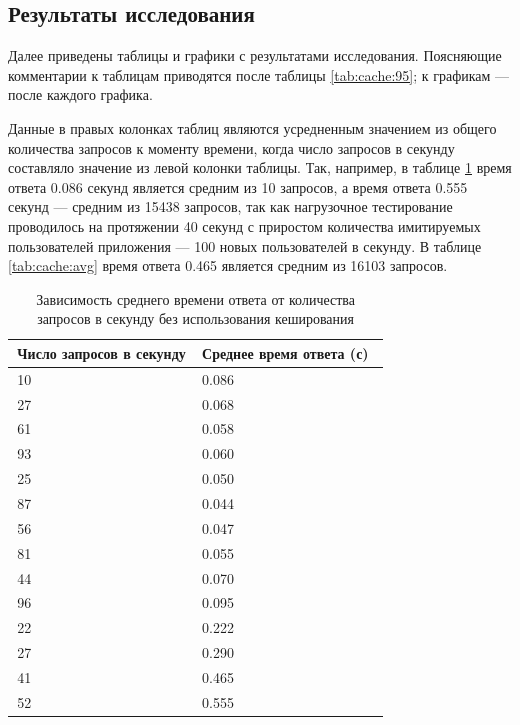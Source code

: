 \subsection{Результаты исследования}

Далее приведены таблицы и графики с результатами исследования.
Поясняющие комментарии к таблицам приводятся после таблицы \ref{tab:cache:95}; к графикам --- после каждого графика.

Данные в правых колонках таблиц являются усредненным значением из общего количества запросов к моменту времени, когда число запросов в секунду составляло значение из левой колонки таблицы.
Так, например, в таблице \ref{tab:nocache:avg} время ответа 0.086 секунд является средним из 10 запросов, а время ответа 0.555 секунд --- средним из 15438 запросов, так как нагрузочное тестирование проводилось на протяжении 40 секунд с приростом количества имитируемых пользователей приложения --- 100 новых пользователей в секунду.
В таблице \ref{tab:cache:avg} время ответа 0.465 является средним из  16103 запросов.

\begin{table}[H]
\centering
\caption{Зависимость среднего времени ответа от количества запросов в секунду без использования кеширования}
\begin{tabular}{|m{6.85cm}|m{9.25cm}|}
\hline
    \,\hfill \textbf{Число запросов в секунду} & \,\hfill \textbf{Среднее время ответа (с)} \hfill\, \\ \hline
    \,\hfill 10 \hfill\, & \,\hfill 0.086 \hfill\, \\ \hline
    \,\hfill 27 \hfill\, & \,\hfill 0.068 \hfill\, \\ \hline
    \,\hfill 61 \hfill\, & \,\hfill 0.058 \hfill\, \\ \hline
    \,\hfill 93 \hfill\, & \,\hfill 0.060 \hfill\, \\ \hline
    \,\hfill 25 \hfill\, & \,\hfill 0.050 \hfill\, \\ \hline
    \,\hfill 87 \hfill\, & \,\hfill 0.044 \hfill\, \\ \hline
    \,\hfill 56 \hfill\, & \,\hfill 0.047 \hfill\, \\ \hline
    \,\hfill 81 \hfill\, & \,\hfill 0.055 \hfill\, \\ \hline
    \,\hfill 44 \hfill\, & \,\hfill 0.070 \hfill\, \\ \hline
    \,\hfill 96 \hfill\, & \,\hfill 0.095 \hfill\, \\ \hline
    \,\hfill 22 \hfill\, & \,\hfill 0.222 \hfill\, \\ \hline
    \,\hfill 27 \hfill\, & \,\hfill 0.290 \hfill\, \\ \hline
    \,\hfill 41 \hfill\, & \,\hfill 0.465 \hfill\, \\ \hline
    \,\hfill 52 \hfill\, & \,\hfill 0.555 \hfill\, \\ \hline
\end{tabular}
\label{tab:nocache:avg}
\end{table}

